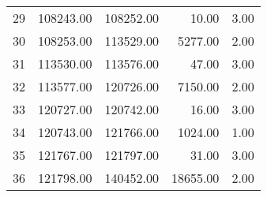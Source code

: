 \begin{tabular}{rrrrr}
  29 & 108243.00 & 108252.00 & 10.00 & 3.00 \\ 
  30 & 108253.00 & 113529.00 & 5277.00 & 2.00 \\ 
  31 & 113530.00 & 113576.00 & 47.00 & 3.00 \\ 
  32 & 113577.00 & 120726.00 & 7150.00 & 2.00 \\ 
  33 & 120727.00 & 120742.00 & 16.00 & 3.00 \\ 
  34 & 120743.00 & 121766.00 & 1024.00 & 1.00 \\ 
  35 & 121767.00 & 121797.00 & 31.00 & 3.00 \\ 
  36 & 121798.00 & 140452.00 & 18655.00 & 2.00 \\ 
   \hline
\end{tabular}
\endgroup
